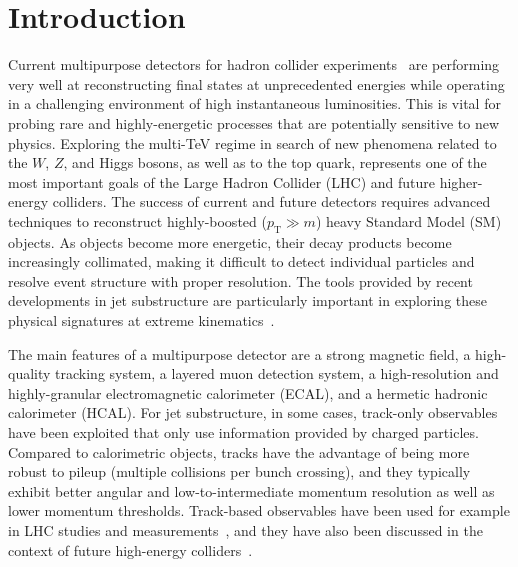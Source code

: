 \documentclass[11pt,letterpaper]{article}
\newcommand{\pt}{p_{\mathrm{T}}}
\begin{document}
\maketitle


\section{Introduction}
\label{sec:introduction}

Current multipurpose detectors for hadron collider experiments~\cite{CMS, Aad:2008zzm} are performing very well at reconstructing final states at unprecedented energies while operating in a challenging environment of high instantaneous luminosities.
%
This is vital for probing rare and highly-energetic processes that are potentially sensitive to new physics.
%
Exploring the multi-TeV regime in search of new phenomena related to the $W$, $Z$, and Higgs bosons, as well as to the top quark, represents one of the most important goals of the Large Hadron Collider (LHC) and future higher-energy colliders.
%
The success of current and future detectors requires advanced techniques to reconstruct highly-boosted ($\pt \gg m$) heavy Standard Model (SM) objects. 
%
As objects become more energetic, their decay products become increasingly collimated, making it difficult to detect individual particles and resolve event structure with proper resolution.
%
The tools provided by recent developments in jet substructure \cite{Seymour:1991cb,Seymour:1993mx,Butterworth:2002tt,Butterworth:2007ke,Butterworth:2008iy} are particularly important in exploring these physical signatures at extreme kinematics~\cite{Abdesselam:2010pt,Altheimer:2012mn,Altheimer:2013yza,Adams:2015hiv,Larkoski:2017jix}.

The main features of a multipurpose detector are a strong magnetic field, a high-quality tracking system, a layered muon detection system, a high-resolution and highly-granular electromagnetic calorimeter (ECAL), and a hermetic hadronic calorimeter (HCAL).
%
For jet substructure, in some cases, track-only observables have been exploited that only use information provided by charged particles.
%
Compared to calorimetric objects, tracks have the advantage of being more robust to pileup (multiple collisions per bunch crossing), and they typically exhibit better angular and low-to-intermediate momentum resolution as well as lower momentum thresholds.
%
Track-based observables have been used for example in LHC studies and measurements~\cite{Aad:2014gea,Aad:2015cua,ATLAS-CONF-2016-055,Aad:2016oit,ATLAS:2016vmy,ATLAS:2016wzt,Krohn:2012fg,Waalewijn:2012sv,Chang:2013iba,Chang:2013rca,Schaetzel:2013vka}, and they have also been discussed in the context of future high-energy colliders~\cite{Larkoski:2015yqa,Spannowsky:2015eba,Bressler:2015uma}.
\end{document}
